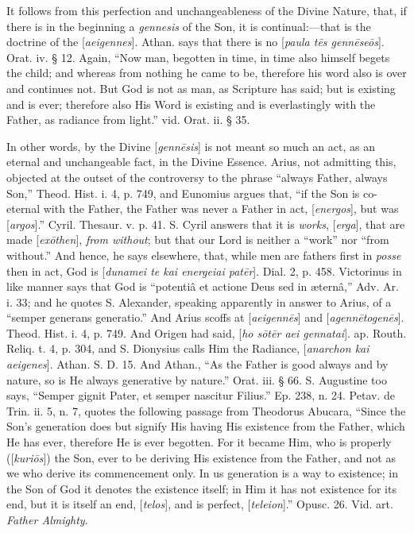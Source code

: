 It follows from this perfection and
unchangeableness of the Divine Nature, that, if there is in the
beginning a \emph{gennesis} of the Son, it is continual:—that is the
doctrine of the [\emph{aeigennes}]. Athan. says that there is no [\emph{paula t\={e}s genn\={e}se\={o}s}]. Orat. iv. § 12.
Again, ``Now man, begotten in time, in time also himself begets the
child; and whereas from nothing he came to be, therefore his word also
is over and continues not. But God is not as man, as Scripture has
said; but is existing and is ever; therefore also His Word is existing
and is everlastingly with the Father, as radiance from light.'' vid.
Orat. ii. § 35.

In other words, by the Divine [\emph{genn\={e}sis}]
is not meant so much an act, as an eternal and unchangeable fact, in
the Divine Essence. Arius, not admitting this, objected at the outset
of the controversy to the phrase ``always Father, always Son,'' Theod.
Hist. i. 4, p. 749, and Eunomius argues that, ``if the Son is
co-eternal with the Father, the Father was never a Father in act, [\emph{energos}],
but was [\emph{argos}].'' Cyril. Thesaur. v. p. 41. S. Cyril answers
that it is \emph{works}, [\emph{erga}], that are made [\emph{ex\={o}then}],
\emph{from without}; but that our Lord is neither a ``work'' nor ``from
without.'' And hence, he says elsewhere, that, while men are fathers
first in \emph{posse} then in act, God is [\emph{dunamei te kai energeiai
pat\={e}r}]. Dial. 2, p. 458. Victorinus in like manner says
that God is ``potentiâ et actione Deus sed in æternâ,'' Adv. Ar. i.
33; and he quotes S. Alexander, speaking apparently in answer to Arius,
of a ``semper generans generatio.'' And Arius scoffs at [\emph{aeigenn\={e}s}]
and [\emph{agenn\={e}togen\={e}s}]. Theod. Hist. i. 4, p. 749.
And Origen had said, [\emph{ho s\={o}t\={e}r aei gennatai}]. ap.
Routh. Reliq. t. 4, p. 304, and S. Dionysius calls Him the Radiance, [\emph{anarchon
kai aeigenes}]. Athan. S. D. 15. And Athan., ``As the Father is good
always and by nature, so is He always generative by nature.'' Orat.
iii. § 66. S. Augustine too says, ``Semper gignit Pater, et
semper nascitur Filius.'' Ep. 238, n. 24. Petav. de Trin. ii. 5, n. 7,
quotes the following passage from Theodorus Abucara, ``Since the Son's
generation does but signify His having His existence from the Father,
which He has ever, therefore He is ever begotten. For it became Him,
who is properly ([\emph{kuri\={o}s}]) the Son, ever to be deriving
His existence from the Father, and not as we who derive its
commencement only. In us generation is a way to existence; in the Son
of God it denotes the existence itself; in Him it has not existence
for its end, but it is itself an end, [\emph{telos}], and is perfect,
[\emph{teleion}].'' Opusc. 26. Vid. art. \emph{Father Almighty}.

